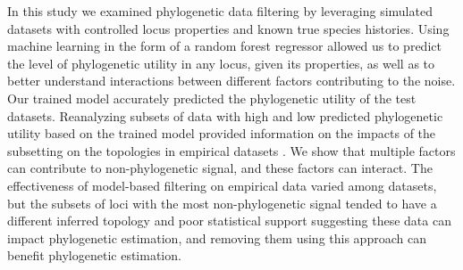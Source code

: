 \documentclass[../main.tex]{subfiles}
\begin{document}
In this study we examined phylogenetic data filtering by leveraging simulated datasets with controlled locus properties and known true species histories. Using machine learning in the form of a random forest regressor allowed us to predict the level of phylogenetic utility in any locus, given its properties, as well as to better understand interactions between different factors contributing to the noise.
Our trained model accurately predicted the phylogenetic utility of the test datasets.
Reanalyzing subsets of data with high and low predicted phylogenetic utility based on the trained model provided information on the impacts of the subsetting on the topologies
in empirical datasets \citep{Fong2012-hy, McGowen2020-ru, Wickett2014-as, Liu2017-wo}.
We show that multiple factors can contribute to non-phylogenetic signal, and these factors can interact. The effectiveness of model-based filtering on empirical data varied among datasets, but the subsets of loci with the most non-phylogenetic signal tended to have a different inferred topology and poor statistical support
suggesting these data can impact phylogenetic estimation, and removing them using this approach can benefit phylogenetic estimation.


\end{document}
